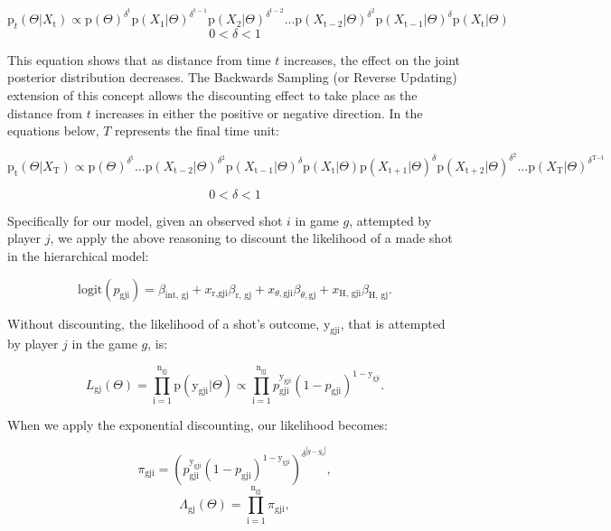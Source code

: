 \documentclass[12pt,twoside]{dukestatscithesis}
\theoremstyle{definition}
\theoremstyle{definition}
\theoremstyle{definition}
\theoremstyle{remark}
\begin{document}
\[
\text{p}_{t}(\Theta | X_\text{t}) \propto 
\text{p}(\Theta)^{\delta^\text{t}}
\text{p}(X_1|\Theta)^{\delta^{\text{t}-1}}
\text{p}(X_2|\Theta)^{\delta^{\text{t}-2}}...
\text{p}(X_{\text{t}-2}|\Theta)^{\delta^2}
\text{p}(X_{\text{t}-1}|\Theta)^{\delta}
\text{p}(X_\text{t}|\Theta)
\] \[
0 < \delta < 1
\]

This equation shows that as distance from time \(\textit{t}\) increases,
the effect on the joint posterior distribution decreases. The Backwards
Sampling (or Reverse Updating) extension of this concept allows the
discounting effect to take place as the distance from \(\textit{t}\)
increases in either the positive or negative direction. In the equations
below, \(T\) represents the final time unit:

\[
\text{p}_{\text{t}}(\Theta | X_\text{T}) \propto
\text{p}(\Theta)^{\delta^\text{t}}
...
\text{p}(X_{\text{t}-2}|\Theta)^{\delta^2}
\text{p}(X_{\text{t}-1}|\Theta)^{\delta}
\text{p}(X_{\text{t}}|\Theta)
\text{p}(X_{\text{t}+1}|\Theta)^{\delta}
\text{p}(X_{\text{t}+2}|\Theta)^{\delta^2}
...
\text{p}(X_\text{T}|\Theta)^{\delta^{\text{T}-\text{t}}}
\]

\[
0 < \delta < 1
\]

Specifically for our model, given an observed shot \(\textit{i}\) in
game \(g\), attempted by player \(\textit{j}\), we apply the above
reasoning to discount the likelihood of a made shot in the hierarchical
model:

\[
\text{logit}(p_{\text{gji}}) = 
\beta_{\text{int, gj}} +
x_{\text{r,gji}}\beta_{\text{r, gj}} +
x_{\theta,\text{gji}}\beta_{\theta, \text{gj}} +
x_{\text{H, gji}}\beta_{\text{H, gj}}.
\]

Without discounting, the likelihood of a shot's outcome,
\(\text{y}_\text{gji}\), that is attempted by player \(\textit{j}\) in
the game \(\textit{g}\), is:

\[
L_\text{gj}(\Theta) =
\prod_{\text{i}=1}^{\text{n}_\text{gj}}{
  \text{p}(\text{y}_{\text{gji}} | \Theta) 
}
\propto 
\prod_{\text{i}=1}^{\text{n}_\text{gj}}{
  p_\text{gji}^{\text{y}_\text{gji}} 
  (1 - p_\text{gji})^{1-\text{y}_\text{gji}}
}.
\]

When we apply the exponential discounting, our likelihood becomes:

\[
\pi_{\text{gji}} =
\left(
  p_\text{gji}^{\text{y}_\text{gji}} 
  (1 - p_\text{gji})^{1-\text{y}_\text{gji}}
\right)
^{\delta^{|g-g_0|}},
\] \[
\Lambda_{\text{gj}}(\Theta) = 
\prod_{\text{i}=1}^{\text{n}_\text{gj}}
  \pi_{\text{gji}},
\]
\end{document}
